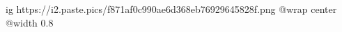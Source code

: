  
 
 
 
 

\ifcmt
  ig https://i2.paste.pics/f871af0c990ae6d368eb76929645828f.png
	@wrap center
	@width 0.8
\fi
